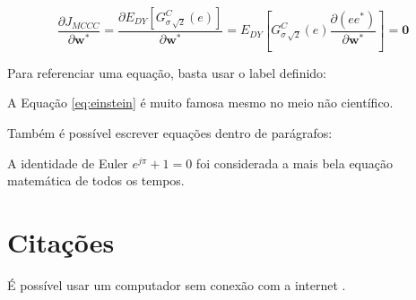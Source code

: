 \documentclass{article}
\begin{document}
    \begin{equation}\nonumber
    \frac{\partial J_{MCCC} }{\partial \textbf{w}^{*}} = \frac{\partial E_{DY}[G^{C}_{\sigma\,\sqrt{2}}(e)] }{\partial \textbf{w}^{*}}  = E_{DY} \left [ G^{C}_{\sigma\,\sqrt{2}}(e)\frac{\partial (ee^*) }{\partial \textbf{w}^{*}} \right ]   =  \textbf{0}
    \end{equation}
    
    
    Para referenciar uma equação, basta usar o label definido:
    
    A Equação \ref{eq:einstein} é muito famosa mesmo no meio não científico. 
    
    Também é possível escrever equações dentro de parágrafos:
    
    
    A identidade de Euler $e^{j\pi} +1 = 0$ foi considerada a mais bela equação matemática de todos os tempos.
    
    \section{Citações}
    
    É possível usar um computador sem conexão com a internet \cite{paper-legal}.
    


\end{document}
